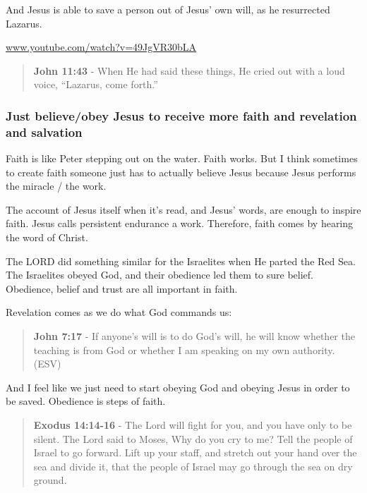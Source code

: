 \documentclass[11pt]{article}
\begin{document}
And Jesus is able to save a person out of Jesus' own will, as he resurrected Lazarus.

\href{https://www.youtube.com/watch?v=49JgVR30bLA}{www.youtube.com/watch?v=49JgVR30bLA}

\begin{quote}
\textbf{John 11:43} - When He had said these things, He cried out with a loud voice, “Lazarus, come forth.”
\end{quote}

\subsubsection{Just believe/obey Jesus to receive more faith and revelation and salvation}
\label{sec:org72d6b7d}

Faith is like Peter stepping out on the water. Faith works. But I think sometimes to create faith someone just has to actually believe Jesus because Jesus performs the miracle / the work.

The account of Jesus itself when it's read, and Jesus' words, are enough to inspire faith. Jesus calls persistent endurance a work. Therefore, faith comes by hearing the word of Christ.

The LORD did something similar for the Israelites when He parted the Red Sea.
The Israelites obeyed God, and their obedience led them to sure belief.
Obedience, belief and trust are all important in faith.

Revelation comes as we do what God commands us:

\begin{quote}
\textbf{John 7:17} - If anyone's will is to do God's will, he will know whether the teaching is from God or whether I am speaking on my own authority. (ESV)
\end{quote}

And I feel like we just need to start obeying God and obeying Jesus in order to be saved. Obedience is steps of faith.

\begin{quote}
\textbf{Exodus 14:14-16} - The Lord will fight for you, and you have only to be silent.  The Lord said to Moses, Why do you cry to me? Tell the people of Israel to go forward.  Lift up your staff, and stretch out your hand over the sea and divide it, that the people of Israel may go through the sea on dry ground.
\end{quote}
\end{document}
